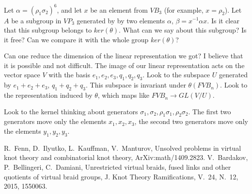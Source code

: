 \documentclass{article}
\begin{document}
Let $\alpha=(\rho_1\sigma_2)^6$, and let $x$ be an element from $VB_3$ (for example, $x=\rho_2$). Let $A$ be a subgroup in $VP_3$ generated by by two elements $\alpha$, $\beta=x^{-1}\alpha x$. Is it clear that this subgroup belongs to $ker(\theta)$. What can we say about this subgroup? Is it free? Can we compare it with the whole group $ker(\theta)$?

Can one reduce the dimension of the linear representation we got? I believe that it is possible and not difficult. The image of our linear representation acts on the vector space $V$ with the basis $e_1,e_2,e_3,q_1,q_2,q_3$. Look to the subspace $U$ generated by $e_1+e_2+e_3$, $q_1+q_2+q_3$. This subspace is invariant under $\theta(FVB_n)$. Look to the representation induced by $\theta$, which maps like $FVB_n\to GL(V/U)$.

Look to the kernel thinking about generators $\sigma_1, \sigma_2, \rho_1\sigma_1,\rho_2\sigma_2$. The first two generators move only the elements $x_1,x_2,x_3$, the second two generators move only the elements $y_1,y_2,y_3$.

\begin{thebibliography}{00}
R.~Fenn, D.~Ilyutko, L.~Kauffman, V.~Manturov, Unsolved problems in virtual knot theory and combinatorial knot theory, ArXiv:math/1409.2823.
V.~Bardakov, P.~Bellingeri, C.~Damiani, Unrestricted virtual braids, fused links and other quotients of virtual braid groups, J. Knot Theory Ramifications, V.~24, N.~12, 2015, 1550063.
\end{thebibliography}
\end{document}
